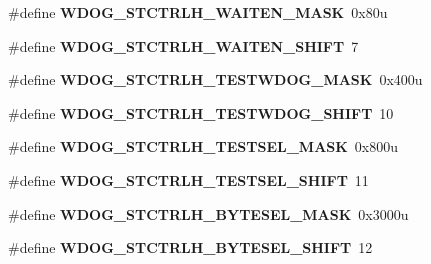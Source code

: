 \begin{DoxyCompactItemize}
\item 
\hypertarget{group___w_d_o_g___register___masks_gad6e2dd88be51a78f133085bb0df3a5f9}{}\#define {\bfseries W\+D\+O\+G\+\_\+\+S\+T\+C\+T\+R\+L\+H\+\_\+\+W\+A\+I\+T\+E\+N\+\_\+\+M\+A\+S\+K}~0x80u\label{group___w_d_o_g___register___masks_gad6e2dd88be51a78f133085bb0df3a5f9}

\item 
\hypertarget{group___w_d_o_g___register___masks_gad224b313777fd019f8ec46f1791a52b7}{}\#define {\bfseries W\+D\+O\+G\+\_\+\+S\+T\+C\+T\+R\+L\+H\+\_\+\+W\+A\+I\+T\+E\+N\+\_\+\+S\+H\+I\+F\+T}~7\label{group___w_d_o_g___register___masks_gad224b313777fd019f8ec46f1791a52b7}

\item 
\hypertarget{group___w_d_o_g___register___masks_ga155c6ba1a6269c937ad8a1e1500686aa}{}\#define {\bfseries W\+D\+O\+G\+\_\+\+S\+T\+C\+T\+R\+L\+H\+\_\+\+T\+E\+S\+T\+W\+D\+O\+G\+\_\+\+M\+A\+S\+K}~0x400u\label{group___w_d_o_g___register___masks_ga155c6ba1a6269c937ad8a1e1500686aa}

\item 
\hypertarget{group___w_d_o_g___register___masks_ga3b923179c1bd41abe9fbab0ee57740c0}{}\#define {\bfseries W\+D\+O\+G\+\_\+\+S\+T\+C\+T\+R\+L\+H\+\_\+\+T\+E\+S\+T\+W\+D\+O\+G\+\_\+\+S\+H\+I\+F\+T}~10\label{group___w_d_o_g___register___masks_ga3b923179c1bd41abe9fbab0ee57740c0}

\item 
\hypertarget{group___w_d_o_g___register___masks_gad8ac03c1a9c77ee59f938c243db30a42}{}\#define {\bfseries W\+D\+O\+G\+\_\+\+S\+T\+C\+T\+R\+L\+H\+\_\+\+T\+E\+S\+T\+S\+E\+L\+\_\+\+M\+A\+S\+K}~0x800u\label{group___w_d_o_g___register___masks_gad8ac03c1a9c77ee59f938c243db30a42}

\item 
\hypertarget{group___w_d_o_g___register___masks_gaf41cdd95d386a6b663fa3adea03699e1}{}\#define {\bfseries W\+D\+O\+G\+\_\+\+S\+T\+C\+T\+R\+L\+H\+\_\+\+T\+E\+S\+T\+S\+E\+L\+\_\+\+S\+H\+I\+F\+T}~11\label{group___w_d_o_g___register___masks_gaf41cdd95d386a6b663fa3adea03699e1}

\item 
\hypertarget{group___w_d_o_g___register___masks_ga20d3012eda5935f73ec4a9e24720fdc2}{}\#define {\bfseries W\+D\+O\+G\+\_\+\+S\+T\+C\+T\+R\+L\+H\+\_\+\+B\+Y\+T\+E\+S\+E\+L\+\_\+\+M\+A\+S\+K}~0x3000u\label{group___w_d_o_g___register___masks_ga20d3012eda5935f73ec4a9e24720fdc2}

\item 
\hypertarget{group___w_d_o_g___register___masks_ga0f73c2f0d56eac9caafc8a0337f95cc8}{}\#define {\bfseries W\+D\+O\+G\+\_\+\+S\+T\+C\+T\+R\+L\+H\+\_\+\+B\+Y\+T\+E\+S\+E\+L\+\_\+\+S\+H\+I\+F\+T}~12\label{group___w_d_o_g___register___masks_ga0f73c2f0d56eac9caafc8a0337f95cc8}


\end{DoxyCompactItemize}
